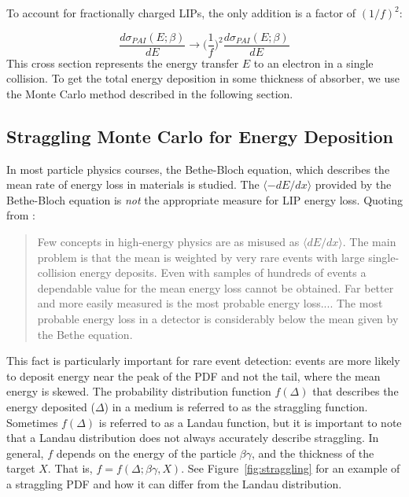 To account for fractionally charged \ac{LIP}s, the only addition is a factor of $(1/f)^{2}$:

\begin{equation}
\frac{d\sigma_{PAI}(E; \beta)}{dE} \longrightarrow \Big(\frac{1}{f}\Big)^{2} \frac{d\sigma_{PAI}(E; \beta)}{dE}
\end{equation}
This cross section represents the energy transfer $E$ to an electron in a single collision. To get the total energy deposition in some thickness of absorber, we use the Monte Carlo method described in the following section.

\subsection{Straggling Monte Carlo for Energy Deposition}
In most particle physics courses, the Bethe-Bloch equation, which describes the mean rate of energy loss in materials is studied. The $\langle - dE/dx \rangle$ provided by the Bethe-Bloch equation is \textit{not} the appropriate measure for \ac{LIP} energy loss. Quoting from \cite{PDG}:

\begin{quote}
Few concepts in high-energy physics are as misused as $\langle dE/dx \rangle$. The main problem is that the mean is weighted by very rare events with large single-collision energy deposits. Even with samples of hundreds of events a dependable value for the mean energy loss cannot be obtained. Far better and more easily measured is the most probable energy loss.... The most probable energy loss in a detector is considerably below the mean given by the Bethe equation.
\end{quote}

This fact is particularly important for rare event detection: events are more likely to deposit energy near the peak of the \ac{PDF} and not the tail, where the mean energy is skewed. The probability distribution function $f(\Delta)$ that describes the energy deposited ($\Delta$) in a medium is referred to as the straggling function. Sometimes $f(\Delta)$ is referred to as a Landau function, but it is important to note that a Landau distribution does not always accurately describe straggling. In general, $f$ depends on the energy of the particle $\beta \gamma$, and the thickness of the target $X$. That is,  $f = f(\Delta; \beta \gamma, X)$. See Figure~\ref{fig:straggling} for an example of a straggling \ac{PDF} and how it can differ from the Landau distribution.

